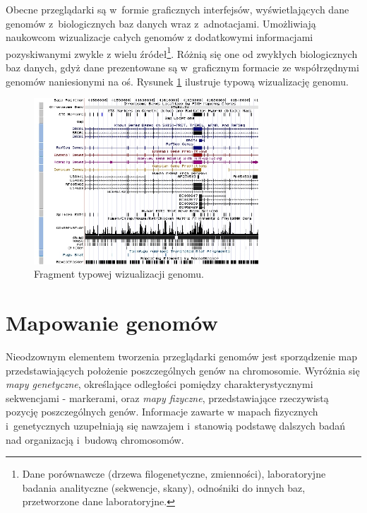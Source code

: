 \documentclass[a4paper,12pt,oneside]{mwrep}  %
\begin{document}
Obecne przeglądarki są w~formie graficznych interfejsów, wyświetlających dane genomów z~biologicznych baz danych wraz z~adnotacjami. Umożliwiają naukowcom wizualizacje całych genomów z dodatkowymi informacjami pozyskiwanymi zwykle z wielu źródeł\footnote{Dane porównawcze (drzewa filogenetyczne, zmienności), laboratoryjne badania analityczne (sekwencje, skany), odnośniki do innych baz, przetworzone dane laboratoryjne.}. Różnią się one od zwykłych biologicznych baz danych, gdyż dane prezentowane są w~graficznym formacie ze współrzędnymi genomów naniesionymi na oś. Rysunek \ref{przykladowa-przegladarka-genomu} ilustruje typową wizualizację genomu.

\begin{figure}[!h]
\centering
\includegraphics[width=0.75\textwidth]{grafika/browsershot_ucsc}
\caption{Fragment typowej wizualizacji genomu.}
\label{przykladowa-przegladarka-genomu}
\end{figure}

\section{Mapowanie genomów}
Nieodzownym elementem tworzenia przeglądarki genomów jest sporządzenie map przedstawiających położenie poszczególnych genów na chromosomie. Wyróżnia się \emph{mapy genetyczne}, określające odległości pomiędzy charakterystycznymi sekwencjami - markerami, oraz \emph{mapy fizyczne}, przedstawiające rzeczywistą pozycję poszczególnych genów. Informacje zawarte w mapach fizycznych i~genetycznych uzupełniają się nawzajem i~stanowią podstawę dalszych badań nad organizacją i~budową chromosomów. 
\end{document}
